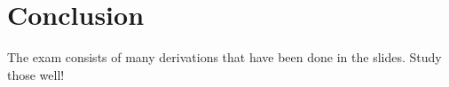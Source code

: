 \section*{Conclusion}\label{sec:conclusion}
The exam consists of many derivations that have been done in the slides. Study those well!
